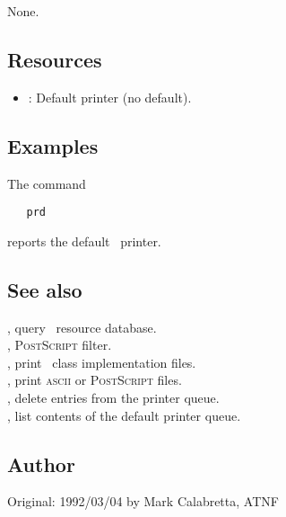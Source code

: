 None.

\subsection*{Resources}

\begin{itemize}
\item
   : Default printer (no default).
\end{itemize}

\subsection*{Examples}

The command

\begin{verbatim}
   prd
\end{verbatim}

\noindent
reports the default \aipspp\ printer.

\subsection*{See also}

, query \aipspp\ resource database.\\
, \textsc{PostScript} filter.\\
, print \aipspp\ class implementation files.\\
, print \textsc{ascii} or \textsc{PostScript} files.\\
, delete entries from the printer queue.\\
, list contents of the default printer queue.

\subsection*{Author}

Original: 1992/03/04 by Mark Calabretta, ATNF


\newpage
\section{}
\label{pri}

